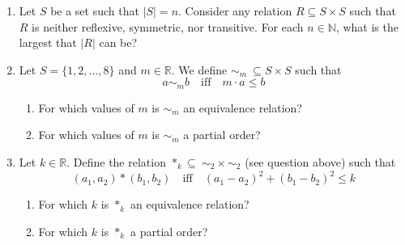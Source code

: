 \documentclass[a4paper, 12pt]{article}
\begin{document}
\begin{enumerate}

    \item Let $S$ be a set such that $|S|=n$. 
    Consider any relation $R \subseteq S \times S$ such that $R$ is neither reflexive, symmetric, nor transitive.
    For each $n \in \mathbb{N}$, what is the largest that $|R|$ can be?
    

    \item Let $S = \{1, 2, \dots, 8 \}$ and $m \in \mathbb{R}$. We define $\sim_m \> \subseteq S \times S$ such that
    \begin{equation*}
        a \sim_m b \quad \text{iff} \quad m \cdot a \leq b
    \end{equation*}
     
    \begin{enumerate}
        \item For which values of $m$ is $\sim_m$ an equivalence relation? 
        \item For which values of $m$ is $\sim_m$ a partial order?
    \end{enumerate}

    \item
    Let $k \in \mathbb{R}$. Define the relation $*_k \subseteq \> \sim_2 \times \sim_2$ (see question above) such that
    \begin{equation*}
        (a_1, a_2) * (b_1, b_2) \quad \text{iff} \quad (a_1-a_2)^2+(b_1-b_2)^2 \leq k
    \end{equation*}

    \begin{enumerate}
        \item For which $k$ is $*_k$ an equivalence relation? 
        \item For which $k$ is $*_k$ a partial order?
    \end{enumerate}

\end{enumerate}
\end{document}
